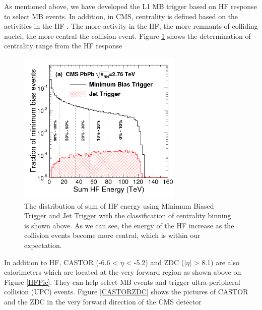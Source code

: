 As mentioned above, we have developed the L1 MB trigger based on HF response to select MB events. In addition, in CMS, centrality is defined based on the activities in the HF \cite{HFCentRef}. The more activity in the HF, the more remnants of colliding nuclei, the more central the collision event. Figure \ref{HFCent} shows the determination of centrality range from the HF response 



\begin{figure}[hbtp]
\begin{center}
\includegraphics[width=0.70\textwidth]{Figures/Chapter2/HFCent.png}
\caption{The distribution of sum of HF energy using Minimum Biased Trigger and Jet Trigger with the classification of centrality binning is shown above. As we can see, the energy of the HF increase as the collision events become more central, which  is within our expectation.}
\label{HFCent}
\end{center}
\end{figure} 



In addition to HF, CASTOR (-6.6 < $\eta$ < -5.2) and ZDC ($|\eta|$ > 8.1) are also calorimeters which are located at the very forward region \cite{CASZDCRef} as shown above on Figure \ref{HFPic}. They can help select MB events and trigger ultra-peripheral collision (UPC) events. Figure \ref{CASTORZDC} shows the pictures of CASTOR and the ZDC in the very forward direction of the CMS detector

